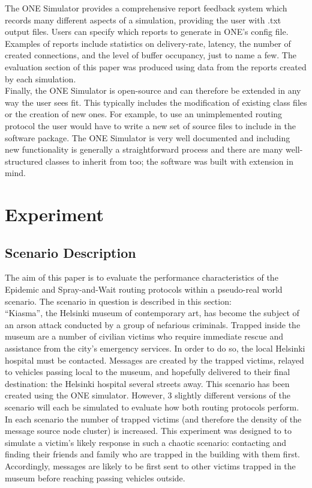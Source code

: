 \documentclass{article}
\begin{document}
\noindent The ONE Simulator provides a comprehensive report feedback system which records many different aspects of a simulation, providing the user with .txt output files. Users can specify which reports to generate in ONE's config file. Examples of reports include statistics on delivery-rate, latency, the number of created connections, and the level of buffer occupancy, just to name a few. The evaluation section of this paper was produced using data from the reports created by each simulation.\\
\newline Finally, the ONE Simulator is open-source and can therefore be extended in any way the user sees fit. This typically includes the modification of existing class files or the creation of new ones. For example, to use an unimplemented routing protocol the user would have to write a new set of source files to include in the software package. The ONE Simulator is very well documented and including new functionality is generally a straightforward process and there are many well-structured classes to inherit from too; the software was built with extension in mind.\\

\section{Experiment}
\subsection{Scenario Description}
The aim of this paper is to evaluate the performance characteristics of the Epidemic and Spray-and-Wait routing protocols within a pseudo-real world scenario. The scenario in question is described in this section:\\
\newline ``Kiasma'', the Helsinki museum of contemporary art, has become the subject of an arson attack conducted by a group of nefarious criminals. Trapped inside the museum are a number of civilian victims who require immediate rescue and assistance from the city's emergency services. In order to do so, the local Helsinki hospital must be contacted. Messages are created by the trapped victims, relayed to vehicles passing local to the museum, and hopefully delivered to their final destination: the Helsinki hospital several streets away.
This scenario has been created using the ONE simulator. However, 3 slightly different versions of the scenario will each be simulated to evaluate how both routing protocols perform. In each scenario the number of trapped victims (and therefore the density of the message source node cluster) is increased. This experiment was designed to to simulate a victim's likely response in such a chaotic scenario: contacting and finding their friends and family who are trapped in the building with them first. Accordingly, messages are likely to be first sent to other victims trapped in the museum before reaching passing vehicles outside.
\end{document}
